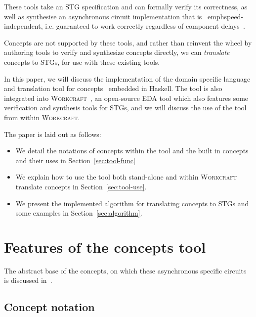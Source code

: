 \documentclass[british,conference,compsoc]{IEEEtran}
\newcommand{\noun}[1]{\textsc{#1}}
\begin{document}
These tools take an STG specification and can formally verify its correctness, 
as well as synthesise an asynchronous circuit implementation that is \
emph{speed-independent}, i.e. guaranteed to work correctly regardless of 
component delays~\cite{Muller_1959_ts}.

Concepts are not supported by these tools, and rather than reinvent the wheel by
authoring tools to verify and synthesize concepts directly, we can 
\emph{translate} concepts to STGs, for use with these existing tools.

In this paper, we will discuss the implementation of the domain specific 
language and translation tool for concepts~\cite{2016_concepts_github} embedded 
in Haskell. The tool is also integrated into 
\noun{Workcraft}~\cite{Workcraft_website}, an open-source EDA tool which also
features some verification and synthesis tools for STGs, and we will discuss 
the use of the tool from within \noun{Workcraft}.

The paper is laid out as follows:
\vspace{-6mm}
\begin{itemize}
  \item We detail the notations of concepts within the tool and the built in
  concepts and their uses in Section~\ref{sec:tool-func}
  \item We explain how to use the tool both stand-alone and within
  \noun{Workcraft} translate concepts in Section~\ref{sec:tool-use}.
  \item We present the implemented algorithm for translating concepts to STGs
  and some examples in Section~\ref{sec:algorithm}.
\end{itemize}


\section{Features of the concepts tool\label{sec:tool-func}}

\vspace{-3mm}

The abstract base of the concepts, on which these asynchronous specific circuits
is discussed in~\cite{2015_Beaumont_MEMOCODE}.

\vspace{-3mm}

\subsection{Concept notation \label{sub:concept-notation}}
\end{document}
